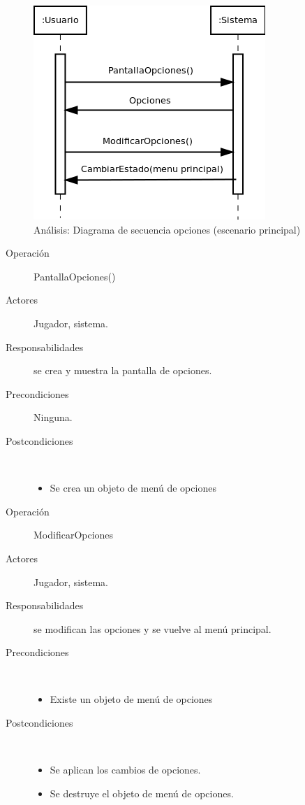 \begin{figure}[H] 
  \label{secuencia_opciones}
  \begin{center}
    \includegraphics[scale=0.7]{imagenes/analisis/secuencia_opciones.png}
  \end{center}
  \caption{Análisis: Diagrama de secuencia opciones (escenario principal)}
\end{figure}

\begin{description}
    \item [Operación] PantallaOpciones()
    \item [Actores] Jugador, sistema.
    \item [Responsabilidades] se crea y muestra la pantalla de opciones.
    \item [Precondiciones] Ninguna.
    \item [Postcondiciones] $\quad$
        \begin{itemize}
            \item Se crea un objeto de menú de opciones
        \end{itemize}
\end{description}

\begin{description}
    \item [Operación] ModificarOpciones
    \item [Actores] Jugador, sistema.
    \item [Responsabilidades] se modifican las opciones y se vuelve al menú principal.
    \item [Precondiciones] $\quad$
        \begin{itemize}
            \item Existe un objeto de menú de opciones
        \end{itemize}
    \item [Postcondiciones] $\quad$
        \begin{itemize}
            \item Se aplican los cambios de opciones.
            \item Se destruye el objeto de menú de opciones.
        \end{itemize}
\end{description}

